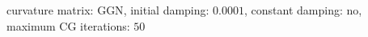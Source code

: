 curvature matrix: $\text{GGN}$, initial damping: $\num[scientific-notation=true]{0.0001}$, constant damping: $\text{no}$, maximum CG iterations: $\num[scientific-notation=false]{50}$
